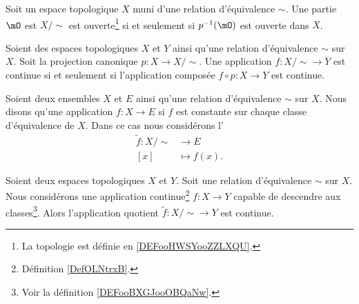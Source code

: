 \begin{proposition}     \label{PROPooDRPLooONCwYs}
    Soit un espace topologique \( X\) muni d'une relation d'équivalence \( \sim\). Une partie \( \mO\) est \( X/\sim\) est ouverte\footnote{La topologie est définie en \ref{DEFooHWSYooZZLXQU}.} si et seulement si \( p^{-1}(\mO)\) est ouverte dans \( X\).
\end{proposition}

\begin{proposition}       \label{PROPooYKLBooQuqnfA}
    Soient des espaces topologiques \( X\) et \( Y\) ainsi qu'une relation d'équivalence \( \sim\) sur \( X\). Soit la projection canonique \( p\colon X\to X/\sim\). Une application \( f\colon X/\sim\to Y\) est continue si et seulement si l'application composée \( f\circ p\colon X\to Y\) est continue.
\end{proposition}

\begin{definition}       \label{DEFooBXGJooOBQaNw}
    Soient deux ensembles \( X\) et \( E\) ainsi qu'une relation d'équivalence \( \sim\) sur \( X\). Nous disons qu'une application \( f\colon X\to E\)  si \( f\) est constante sur chaque classe d'équivalence de \( X\). Dans ce cas nous considérons l' 
    \begin{equation}
        \begin{aligned}
            \tilde f\colon X/\sim&\to E \\
            [x]&\mapsto f(x). 
        \end{aligned}
    \end{equation}
\end{definition}

\begin{lemma}     \label{LEMooKTINooKDjNeX}
    Soient deux espaces topologiques \( X\) et \( Y\). Soit une relation d'équivalence \( \sim\) sur \( X\). Nous considérons une application continue\footnote{Définition \ref{DefOLNtrxB}.} \( f\colon X\to Y\) capable de descendre aux classes\footnote{Voir la définition \ref{DEFooBXGJooOBQaNw}.}. Alors l'application quotient \( \tilde f\colon X/\sim\to Y\) est continue.
\end{lemma}

